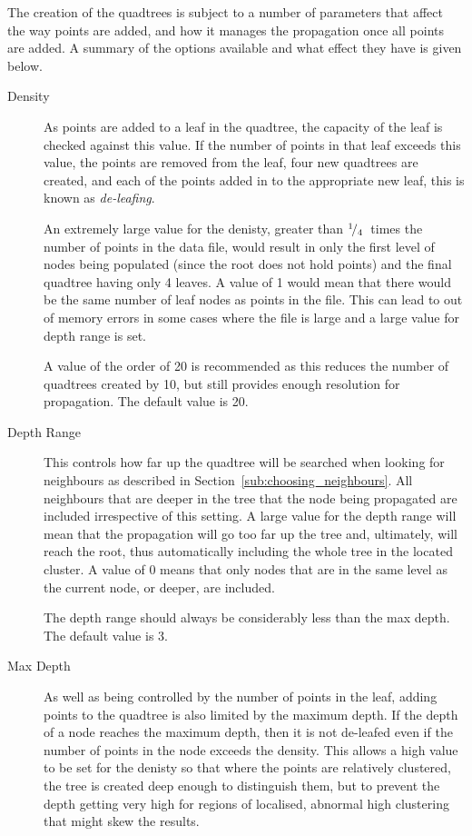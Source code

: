 The creation of the quadtrees is subject to a number of parameters that affect
the way points are added, and how it manages the propagation once all points
are added. A summary of the options available and what effect they have is
given below.

\begin{description}

	\item[Density] As points are added to a leaf in the quadtree, the capacity
		of the leaf is checked against this value. If the number of points in
		that leaf exceeds this value, the points are removed from the leaf,
		four new quadtrees are created, and each of the points added in to the
		appropriate new leaf, this is known as \emph{de-leafing}.

		An extremely large value for the denisty, greater than
		${}^{1}\!/_{4}$~times the number of points in the data file, would
		result in only the first level of nodes being populated (since the root
		does not hold points) and the final quadtree having only 4 leaves. A
		value of 1 would mean that there would be the same number of leaf nodes
		as points in the file. This can lead to out of memory errors in some
		cases where the file is large and a large value for depth range is set.

		A value of the order of 20 is recommended as this reduces the number of
		quadtrees created by 10, but still provides enough resolution for
		propagation. The default value is 20.

	\item[Depth Range] This controls how far up the quadtree will be searched
		when looking for neighbours as described in
		Section~\ref{sub:choosing_neighbours}. All neighbours that are deeper
		in the tree that the node being propagated are included irrespective of
		this setting. A large value for the depth range will mean that the
		propagation will go too far up the tree and, ultimately, will reach the
		root, thus automatically including the whole tree in the located
		cluster. A value of 0 means that only nodes that are in the same level
		as the current node, or deeper, are included.

		The depth range should always be considerably less than the max depth.
		The default value is 3.

	\item[Max Depth] As well as being controlled by the number of points in the
		leaf, adding points to the quadtree is also limited by the maximum
		depth. If the depth of a node reaches the maximum depth, then it is not
		de-leafed even if the number of points in the node exceeds the density.
		This allows a high value to be set for the denisty so that where the
		points are relatively clustered, the tree is created deep enough to
		distinguish them, but to prevent the depth getting very high for
		regions of localised, abnormal high clustering that might skew the
		results.


\end{description}
